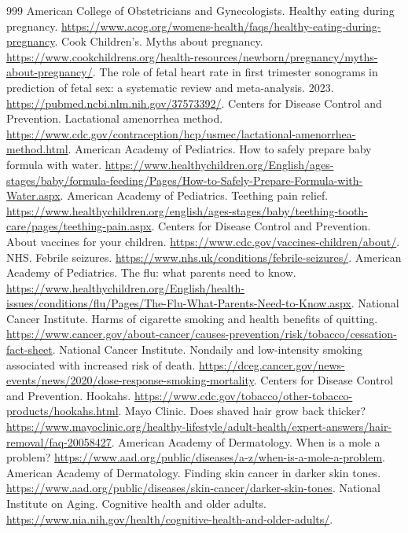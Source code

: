 \documentclass[11pt,oneside]{book}
\begin{document}
\begin{thebibliography}{999}
American College of Obstetricians and Gynecologists. Healthy eating during pregnancy. \url{https://www.acog.org/womens-health/faqs/healthy-eating-during-pregnancy}.
Cook Children's. Myths about pregnancy. \url{https://www.cookchildrens.org/health-resources/newborn/pregnancy/myths-about-pregnancy/}.
The role of fetal heart rate in first trimester sonograms in prediction of fetal sex: a systematic review and meta-analysis. 2023. \url{https://pubmed.ncbi.nlm.nih.gov/37573392/}.
Centers for Disease Control and Prevention. Lactational amenorrhea method. \url{https://www.cdc.gov/contraception/hcp/usmec/lactational-amenorrhea-method.html}.
American Academy of Pediatrics. How to safely prepare baby formula with water. \url{https://www.healthychildren.org/English/ages-stages/baby/formula-feeding/Pages/How-to-Safely-Prepare-Formula-with-Water.aspx}.
American Academy of Pediatrics. Teething pain relief. \url{https://www.healthychildren.org/english/ages-stages/baby/teething-tooth-care/pages/teething-pain.aspx}.
Centers for Disease Control and Prevention. About vaccines for your children. \url{https://www.cdc.gov/vaccines-children/about/}.
NHS. Febrile seizures. \url{https://www.nhs.uk/conditions/febrile-seizures/}.
American Academy of Pediatrics. The flu: what parents need to know. \url{https://www.healthychildren.org/English/health-issues/conditions/flu/Pages/The-Flu-What-Parents-Need-to-Know.aspx}.
National Cancer Institute. Harms of cigarette smoking and health benefits of quitting. \url{https://www.cancer.gov/about-cancer/causes-prevention/risk/tobacco/cessation-fact-sheet}.
National Cancer Institute. Nondaily and low-intensity smoking associated with increased risk of death. \url{https://dceg.cancer.gov/news-events/news/2020/dose-response-smoking-mortality}.
Centers for Disease Control and Prevention. Hookahs. \url{https://www.cdc.gov/tobacco/other-tobacco-products/hookahs.html}.
Mayo Clinic. Does shaved hair grow back thicker? \url{https://www.mayoclinic.org/healthy-lifestyle/adult-health/expert-answers/hair-removal/faq-20058427}.
American Academy of Dermatology. When is a mole a problem? \url{https://www.aad.org/public/diseases/a-z/when-is-a-mole-a-problem}.
American Academy of Dermatology. Finding skin cancer in darker skin tones. \url{https://www.aad.org/public/diseases/skin-cancer/darker-skin-tones}.
National Institute on Aging. Cognitive health and older adults. \url{https://www.nia.nih.gov/health/cognitive-health-and-older-adults/}.

\end{thebibliography}
\end{document}
